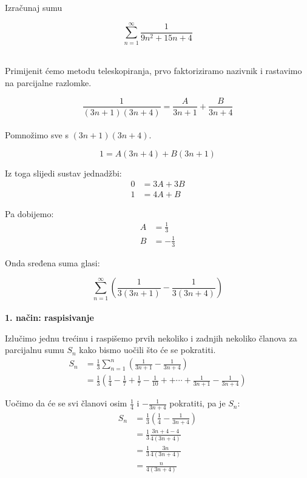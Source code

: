 \documentclass[exam.tex]{subfiles}
\begin{document}
	\begin{task}
		Izračunaj sumu
	
		\[ \sum\limits_{n=1}^\infty \frac{1}{9n^2 + 15n + 4} \] \\[1em]
	\end{task}
	
	Primijenit ćemo metodu teleskopiranja, prvo faktoriziramo nazivnik i rastavimo na parcijalne razlomke.
	
	\[ \frac{1}{(3n + 1)(3n + 4)} = \frac{A}{3n + 1} + \frac{B}{3n + 4} \] \\
	
	Pomnožimo sve s \( (3n + 1)(3n + 4) \).
	
	\[ 1 = A(3n + 4) + B(3n + 1) \]
	
	Iz toga slijedi sustav jednadžbi:
	\begin{align*}
		0 &= 3A + 3B \\
		1 &= 4A + B
	\end{align*}
	
	Pa dobijemo:
	\begin{align*}
		A &= \frac{1}{3} \\
		B &= - \frac{1}{3}
	\end{align*}
	
	Onda sređena suma glasi:
	
	\[ \sum\limits_{n=1}^\infty \left ( \frac{1}{3(3n + 1)} - \frac{1}{3(3n + 4)} \right ) \] \\
	
	\textbf{1. način: raspisivanje}
	
	Izlučimo jednu trećinu i raspišemo prvih nekoliko i zadnjih nekoliko članova za parcijalnu sumu \( S_n \) kako bismo uočili što će se pokratiti.
	\begin{align*}
		S_n &= \frac{1}{3} \sum\limits_{n=1}^n \left ( \frac{1}{3n + 1} - \frac{1}{3n + 4} \right ) \\ 
		&= \frac{1}{3} \left ( \frac{1}{4} - \frac{1}{7} + \frac{1}{7} - \frac{1}{10} +  + \cdots + \frac{1}{3n + 1} - \frac{1}{3n + 4} \right )
	\end{align*}
	
	Uočimo da će se svi članovi osim \( \frac{1}{4} \) i \( - \frac{1}{3n + 4} \) pokratiti, pa je \( S_n \):
	\begin{align*}
		S_n &= \frac{1}{3} \left ( \frac{1}{4} - \frac{1}{3n + 4} \right ) \\
		&= \frac{1}{3} \frac{3n + 4 - 4}{4(3n + 4)} \\
		&= \frac{1}{3} \frac{3n}{4(3n + 4)} \\
		&= \frac{n}{4(3n + 4)}
	\end{align*}		
	
\end{document}

